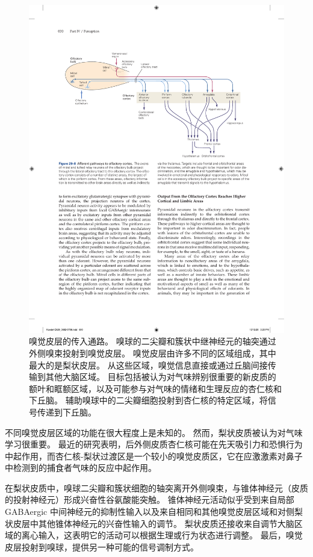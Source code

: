 \begin{figure}[htbp]
	\centering
	\includegraphics[width=0.9\linewidth]{chap29/fig_29_8}
	\caption{嗅觉皮层的传入通路。 嗅球的二尖瓣和簇状中继神经元的轴突通过外侧嗅束投射到嗅觉皮层。 嗅觉皮层由许多不同的区域组成，其中最大的是梨状皮层。 从这些区域，嗅觉信息直接或通过丘脑间接传输到其他大脑区域。 目标包括被认为对气味辨别很重要的新皮质的额叶和眶额区域，以及可能参与对气味的情绪和生理反应的杏仁核和下丘脑。 辅助嗅球中的二尖瓣细胞投射到杏仁核的特定区域，将信号传递到下丘脑。}
	\label{fig:29_8}
\end{figure}

不同嗅觉皮层区域的功能在很大程度上是未知的。 然而，梨状皮质被认为对气味学习很重要。 最近的研究表明，后外侧皮质杏仁核可能在先天吸引力和恐惧行为中起作用，而杏仁核-梨状过渡区是一个较小的嗅觉皮质区，它在应激激素对鼻子中检测到的捕食者气味的反应中起作用。

在梨状皮质中，嗅球二尖瓣和簇状细胞的轴突离开外侧嗅束，与锥体神经元（皮质的投射神经元）形成兴奋性谷氨酸能突触。 锥体神经元活动似乎受到来自局部 GABAergic 中间神经元的抑制性输入以及来自相同和其他嗅觉皮层区域和对侧梨状皮层中其他锥体神经元的兴奋性输入的调节。 梨状皮质还接收来自调节大脑区域的离心输入，这表明它的活动可以根据生理或行为状态进行调整。 最后，嗅觉皮层投射到嗅球，提供另一种可能的信号调制方式。

